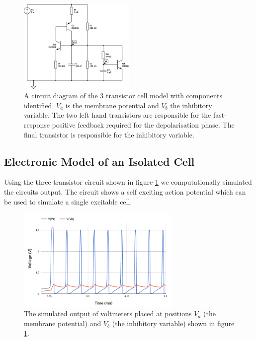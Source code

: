 \begin{figure}
    \centering
    \includegraphics[width=0.5\textwidth]{images/3-transistor-circuit.png}
    \caption{A circuit diagram of the 3 transistor cell model with components identified. $V_a$ is the membrane potential and $V_b$ the inhibitory variable. The two left hand transistors are responsible for the fast-response positive feedback required for the depolarisation phase. The final transistor is responsible for the inhibitory variable.}
    \label{fig3.4}
\end{figure}

\subsection{Electronic Model of an Isolated Cell}
Using the three transistor circuit shown in figure \ref{fig3.4} we computationally simulated the circuits output. The circuit shows a self exciting action potential which can be used to simulate a single excitable cell.
\begin{figure}[H]
    \centering
    \includegraphics[width=0.7\textwidth]{images/singlecellelec.png}
    \caption{The simulated output of voltmeters placed at positions $V_a$ (the membrane potential) and $V_b$ (the inhibitory variable) shown in figure \ref{fig3.4}.}
    \label{fig3.5}
\end{figure}

